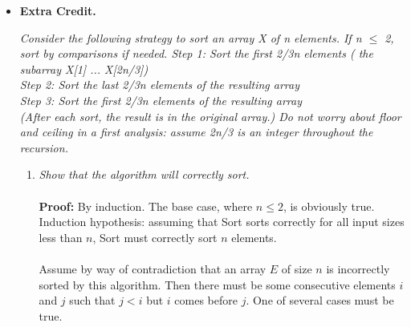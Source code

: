 \documentclass[a4paper]{article}
\begin{document}
\begin{itemize}
\item{\textbf{Extra Credit.}}

\emph{Consider the following strategy to sort an array X of n elements.
If n $\leq$ 2, sort by comparisons if needed.
Step 1: Sort the first 2/3n elements ( the subarray X[1] ... X[2n/3]) \\
Step 2: Sort the last 2/3n elements of the resulting array\\
Step 3: Sort the first 2/3n elements of the resulting array\\
(After each sort, the result is in the original array.) 
Do not worry about floor and ceiling in a first analysis: assume 2n/3 is an integer throughout the recursion.}
\begin{enumerate}
\item \emph{Show that the algorithm will correctly sort.} \\
\\
\textbf{Proof:} By induction. The base case, where $n \leq 2$, is obviously true. Induction hypothesis: assuming that Sort sorts correctly for all input sizes less than $n$, Sort must correctly sort $n$ elements. \\
\\
Assume by way of contradiction that an array $E$ of size $n$ is incorrectly sorted by this algorithm. Then there must be some consecutive elements $i$ and $j$ such that $j < i$ but $i$ comes before $j$. One of several cases must be true. \\


\end{enumerate}
\end{itemize}
\end{document}

